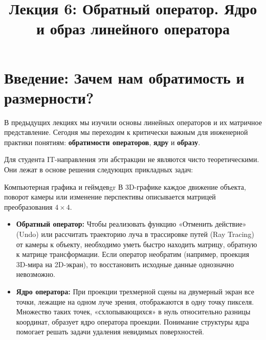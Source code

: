 \documentclass[12pt,a4paper]{article}
\title{Лекция 6: Обратный оператор. Ядро и образ линейного оператора}
\author{}
\date{}
\begin{document}
\maketitle
\setcounter{section}{6}

\section*{Введение: Зачем нам обратимость и размерности?}

В предыдущих лекциях мы изучили основы линейных операторов и их
матричное представление. Сегодня мы переходим к критически важным для
инженерной практики понятиям: \textbf{обратимости операторов},
\textbf{ядру} и \textbf{образу}.

Для студента IT-направления эти абстракции не являются чисто
теоретическими. Они лежат в основе решения следующих прикладных задач:

\begin{remarkIT}{Компьютерная графика и геймдев}{gr}
  В 3D-графике каждое движение объекта, поворот камеры или изменение
  перспективы описывается матрицей преобразования $4 \times 4$.
  \begin{itemize}
    \item \textbf{Обратный оператор:} Чтобы реализовать функцию
      «Отменить действие» (Undo) или рассчитать траекторию луча в
      трассировке путей (Ray Tracing) от камеры к объекту, необходимо
      уметь быстро находить матрицу, обратную к матрице
      трансформации. Если оператор необратим (например, проекция
      3D-мира на 2D-экран), то восстановить исходные данные
      однозначно невозможно.
    \item \textbf{Ядро оператора:} При проекции трехмерной сцены на
      двумерный экран все точки, лежащие на одном луче зрения,
      отображаются в одну точку пикселя. Множество таких точек,
      «схлопывающихся» в нуль относительно разницы координат,
      образует ядро оператора проекции. Понимание структуры ядра
      помогает решать задачи удаления невидимых поверхностей.
  \end{itemize}
\end{remarkIT}
\end{document}
